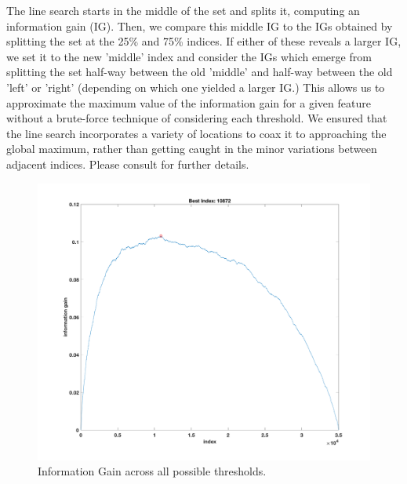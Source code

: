 The line search starts in the middle of the set and splits it, computing an information gain (IG). Then, we compare this middle IG to the IGs obtained by splitting the set at the 25\% and 75\% indices. If either of these reveals a larger IG, we set it to the new 'middle' index and consider the IGs which emerge from splitting the set half-way between the old 'middle' and half-way between the old 'left' or 'right' (depending on which one yielded a larger IG.) This allows us to approximate the maximum value of the information gain for a given feature without a brute-force technique of considering each threshold. We ensured that the line search incorporates a variety of locations to coax it to approaching the global maximum, rather than getting caught in the minor variations between adjacent indices. Please consult  for further details.
%
\begin{figure}[H]
  \centering\includegraphics[width=0.6\columnwidth]{../images/IG}
  \caption{Information Gain across all possible thresholds.}
  \label{fig:IG}
\end{figure}

